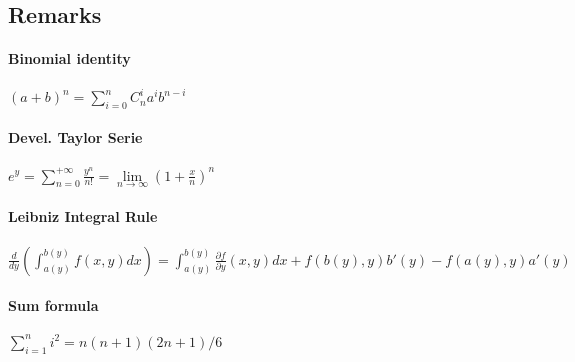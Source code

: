 \documentclass[paper=a4,fontsize=8pt,pagesize,DIV=calc]{scrartcl}
\newcounter{row}
\begin{document}
\begin{multicols}{3}
\section{Remarks}
\paragraph{Binomial identity} $(a+b)^n=\sum^n_{i=0}C^i_na^ib^{n-i}$
\paragraph{Devel. Taylor Serie} $e^y=\sum^{+\infty}_{n=0}\frac{y^n}{n!}=\lim\limits_{n \rightarrow \infty} (1+\frac{x}{n})^n$
\paragraph{Leibniz Integral Rule} $\frac{d}{dy}\left( \int^{b(y)}_{a(y)} f(x,y) dx \right)=\int^{b(y)}_{a(y)} \frac{\partial f}{\partial y}(x,y) dx+f(b(y),y)b'(y)-f(a(y),y)a'(y)$
\paragraph{Sum formula} $\sum^n_{i=1} i^2=n(n+1)(2n+1)/6$

\end{multicols}
\end{document}
